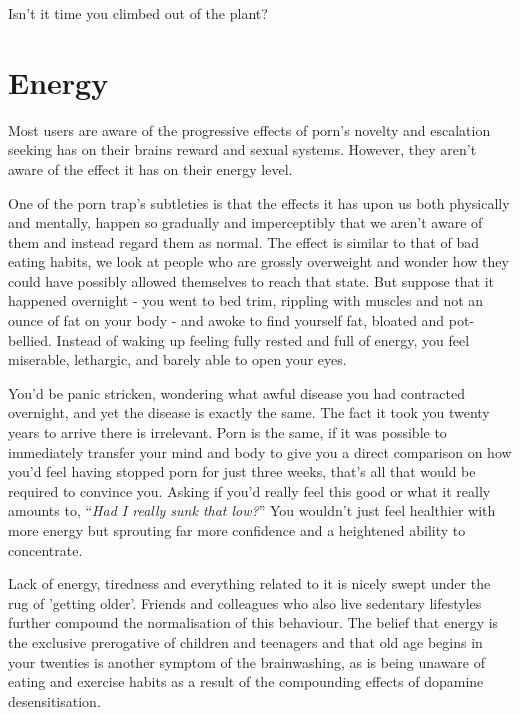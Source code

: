 \documentclass[
]{book}
\begin{document}
Isn't it time you climbed out of the plant?

\hypertarget{energy}{%
\section{Energy}\label{energy}}

Most users are aware of the progressive effects of porn's novelty and escalation seeking has on their brains reward and sexual systems. However, they aren't aware of the effect it has on their energy level.

One of the porn trap's subtleties is that the effects it has upon us both physically and mentally, happen so gradually and imperceptibly that we aren't aware of them and instead regard them as normal. The effect is similar to that of bad eating habits, we look at people who are grossly overweight and wonder how they could have possibly allowed themselves to reach that state. But suppose that it happened overnight - you went to bed trim, rippling with muscles and not an ounce of fat on your body - and awoke to find yourself fat, bloated and pot-bellied. Instead of waking up feeling fully rested and full of energy, you feel miserable, lethargic, and barely able to open your eyes.

You'd be panic stricken, wondering what awful disease you had contracted overnight, and yet the disease is exactly the same. The fact it took you twenty years to arrive there is irrelevant. Porn is the same, if it was possible to immediately transfer your mind and body to give you a direct comparison on how you'd feel having stopped porn for just three weeks, that's all that would be required to convince you. Asking if you'd really feel this good or what it really amounts to, ``\emph{Had I really sunk that low?}'' You wouldn't just feel healthier with more energy but sprouting far more confidence and a heightened ability to concentrate.

Lack of energy, tiredness and everything related to it is nicely swept under the rug of 'getting older'. Friends and colleagues who also live sedentary lifestyles further compound the normalisation of this behaviour. The belief that energy is the exclusive prerogative of children and teenagers and that old age begins in your twenties is another symptom of the brainwashing, as is being unaware of eating and exercise habits as a result of the compounding effects of dopamine desensitisation.
\end{document}
